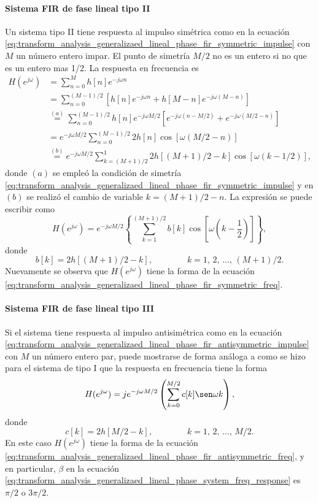 \documentclass[a4paper]{report}
\begin{document}
\paragraph{Sistema FIR de fase lineal tipo II} Un sistema tipo II tiene respuesta al impulso simétrica como en la ecuación \ref{eq:transform_analysis_generalizaed_lineal_phase_fir_symmetric_impulse}
con \(M\) un número entero impar. El punto de simetría \(M/2\) no es un entero si no que es un entero mas 1/2. La respuesta en frecuencia es
\begin{align*}
 H(e^{j\omega})&=\sum_{n=0}^M h[n]e^{-j\omega n}\\
  &=\sum_{n=0}^{(M-1)/2}\left[h[n]e^{-j\omega n}+h[M-n]e^{-j\omega(M-n)}\right]\\
  &\overset{(a)}{=}\sum_{n=0}^{(M-1)/2}h[n]e^{-j\omega M/2}\left[e^{-j\omega(n-M/2)}+e^{-j\omega(M/2-n)}\right]\\
  &=e^{-j\omega M/2}\sum_{n=0}^{(M-1)/2}2h[n]\cos[\omega(M/2-n)]\\
  &\overset{(b)}{=}e^{-j\omega M/2}\sum_{k=(M+1)/2}^1 2h[(M+1)/2-k]\cos[\omega(k-1/2)],
\end{align*}
donde \((a)\) se empleó la condición de simetría \ref{eq:transform_analysis_generalizaed_lineal_phase_fir_symmetric_impulse} y en \((b)\) se realizó el cambio de variable \(k=(M+1)/2-n\). La expresión se puede escribir como
\[
 H(e^{j\omega})=e^{-j\omega M/2}\left\{\sum_{k=1}^{(M+1)/2}b[k]\cos\left[\omega\left(k-\frac{1}{2}\right)\right]\right\},
\]
donde
\[
 b[k]=2h[(M+1)/2-k],
 \qquad\qquad 
 k=1,\,2,\,\dots,\,(M+1)/2.
\]
Nuevamente se observa que \(H(e^{j\omega})\) tiene la forma de la ecuación \ref{eq:transform_analysis_generalizaed_lineal_phase_fir_symmetric_freq}.

\paragraph{Sistema FIR de fase lineal tipo III} Si el sistema tiene respuesta al impulso antisimétrica
como en la ecuación \ref{eq:transform_analysis_generalizaed_lineal_phase_fir_antisymmetric_impulse}
con \(M\) un número entero par, puede mostrarse de forma análoga a como se hizo para el sistema de tipo I que la respuesta en frecuencia tiene la forma
\[
 H(e^{j\omega})=je^{-j\omega M/2}\left(\sum_{k=0}^{M/2}c[k]\sen\omega k\right),
\]
donde
\[
 c[k]=2h[M/2-k],
 \qquad\qquad 
 k=1,\,2,\,\dots,\,M/2.
\]
En este caso \(H(e^{j\omega})\) tiene la forma de la ecuación \ref{eq:transform_analysis_generalizaed_lineal_phase_fir_antisymmetric_freq}, y en particular, \(\beta\) en la ecuación \ref{eq:transform_analysis_generalizaed_lineal_phase_system_freq_response} es \(\pi/2\) o \(3\pi/2\).
\end{document}
